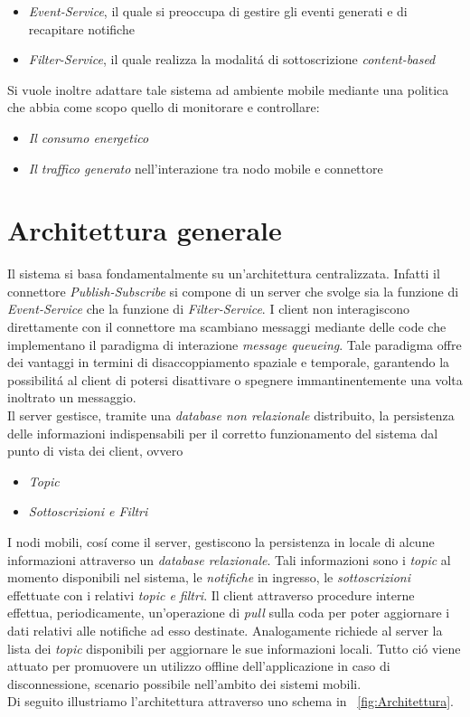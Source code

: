 \documentclass{article}
\begin{document}
\begin{itemize}
\item{\textit{Event-Service}, il quale si preoccupa di gestire gli eventi generati e di recapitare notifiche}
\item{\textit{Filter-Service}, il quale realizza la modalit\'a di sottoscrizione \textit{content-based}}
\end{itemize}

Si vuole inoltre adattare tale sistema ad ambiente mobile mediante una politica che abbia come scopo quello di monitorare e controllare:

\begin{itemize}
\item{\textit{Il consumo energetico}}
\item{\textit{Il traffico generato} nell'interazione tra nodo mobile e connettore}
\end{itemize}

\section{Architettura generale}

Il sistema si basa fondamentalmente su un'architettura centralizzata. Infatti il connettore \textit{Publish-Subscribe} si compone di un server che svolge sia la funzione di \textit{Event-Service} che la funzione di \textit{Filter-Service}. I client non interagiscono direttamente con il connettore ma scambiano messaggi mediante delle code che implementano il paradigma di interazione \textit{message queueing}. Tale paradigma offre dei vantaggi in termini di disaccoppiamento spaziale e temporale, garantendo la possibilit\'a al client di potersi disattivare o spegnere immantinentemente una volta inoltrato un messaggio.
\\
Il server gestisce, tramite una \textit{database non relazionale} distribuito, la persistenza delle informazioni indispensabili per il corretto funzionamento del sistema dal punto di vista dei client, ovvero

\begin{itemize}
\item{\textit{Topic}}
\item{\textit{Sottoscrizioni e Filtri}}
\end{itemize}

I nodi mobili, cos\'i come il server, gestiscono la persistenza in locale di alcune informazioni attraverso un \textit{database relazionale}. Tali informazioni sono i \textit{topic} al momento disponibili nel sistema, le \textit{notifiche} in ingresso, le \textit{sottoscrizioni} effettuate con i relativi \textit{topic e filtri}. Il client attraverso procedure interne effettua, periodicamente,  un'operazione di \textit{pull} sulla coda per poter aggiornare i dati relativi alle notifiche ad esso destinate. Analogamente richiede al server la lista dei \textit{topic} disponibili per aggiornare le sue informazioni locali. Tutto ci\'o viene attuato per promuovere un utilizzo offline dell'applicazione in caso di disconnessione, scenario possibile nell'ambito dei sistemi mobili.\\
Di seguito illustriamo l'architettura attraverso uno schema in \figurename{~\ref{fig:Architettura}}.
\end{document}
